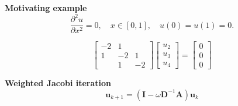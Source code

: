\documentclass[aspectratio=169]{beamer}
\begin{document}
{
}

\begin{frame}[t, c]{}{}
  \centering
  \textbf{Motivating example}
  \medskip
  \large
  \[
  \dfrac{\partial^2 u}{\partial x^2} = 0, \quad x \in \left[0, 1\right], \quad u(0) = u(1) = 0.
  \]

  \vspace{-1cm}
\end{frame}

\begin{frame}
  \Large
  \[
  \begin{bmatrix}
    -2 & 1 &   \\
    1 & -2 & 1 \\
      & 1 & -2
  \end{bmatrix}
  \begin{bmatrix}
    u_2 \\ u_3 \\ u_4
  \end{bmatrix}
  =
  \begin{bmatrix}
    0 \\ 0 \\ 0
  \end{bmatrix}
  \]

  \vspace{-1cm}
\end{frame}

{
}

\begin{frame}
  \centering
  \textbf{Weighted Jacobi iteration}
  \medskip
  \Large
  \[
  \bm{u}_{k+1} = \left( \bm{I} - \omega \bm{D}^{-1} \bm{A} \right) \bm{u}_k
  \]

  \vspace{-1.5cm}
\end{frame}
\end{document}
